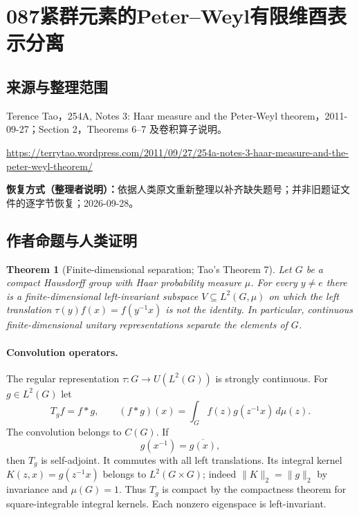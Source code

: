 \documentclass[UTF8,11pt]{ctexart}
\newtheorem*{theorem}{Theorem}
\theoremstyle{definition}
\begin{document}
\section*{087\quad 紧群元素的Peter--Weyl有限维酉表示分离}
\subsection*{来源与整理范围}
Terence Tao，254A, Notes 3: Haar measure and the Peter-Weyl theorem，2011-09-27；Section 2，Theorems 6--7 及卷积算子说明。
\par\url{https://terrytao.wordpress.com/2011/09/27/254a-notes-3-haar-measure-and-the-peter-weyl-theorem/}
\par\textbf{恢复方式（整理者说明）：}依据人类原文重新整理以补齐缺失题号；并非旧题证文件的逐字节恢复；2026-09-28。
\subsection*{作者命题与人类证明}

\begin{theorem}[Finite-dimensional separation; Tao's Theorem 7]
Let $G$ be a compact Hausdorff group with Haar probability measure $\mu$.
For every $y\ne e$ there is a finite-dimensional left-invariant subspace
$V\subseteq L^2(G,\mu)$ on which the left translation
$\tau(y)f(x)=f(y^{-1}x)$ is not the identity. In particular, continuous
finite-dimensional unitary representations separate the elements of $G$.
\end{theorem}
\paragraph{Convolution operators.}
The regular representation $\tau:G\to U(L^2(G))$ is strongly continuous.
For $g\in L^2(G)$ let
\[
 T_gf=f*g,\qquad (f*g)(x)=\int_G f(z)g(z^{-1}x)\,d\mu(z).
\]
The convolution belongs to $C(G)$. If
\begin{equation}\label{selfadjoint-kernel}
 g(x^{-1})=\overline{g(x)},
\end{equation}
then $T_g$ is self-adjoint. It commutes with all left translations.
Its integral kernel $K(z,x)=g(z^{-1}x)$ belongs to $L^2(G\times G)$;
indeed $\|K\|_2=\|g\|_2$ by invariance and $\mu(G)=1$.
Thus $T_g$ is compact by the compactness theorem for square-integrable
integral kernels. Each nonzero eigenspace is left-invariant.
\end{document}
